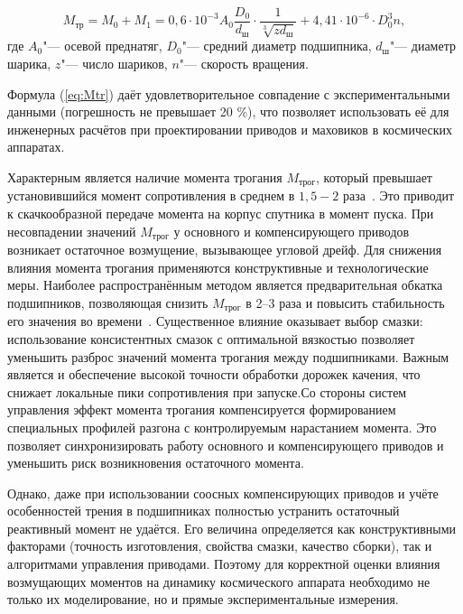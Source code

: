 \begin{equation}
	\label{eq:Mtr}
	M_{\text{тр}} = M_0 + M_1 = 0{,}6 \cdot 10^{-3} A_0
	\frac{D_0}{d_{\text{ш}}} \cdot \frac{1}{\sqrt[3]{z d_{\text{ш}}}}+4{,}41 \cdot 10^{-6} \cdot D_0^3 n,
\end{equation}
где \(A_0\)"--- осевой преднатяг, \(D_0\)"--- средний диаметр подшипника, \(d_{\text{ш}}\)"--- диаметр шарика, \(z\)"--- число шариков, \(n\)"--- скорость вращения.
	
Формула (\ref{eq:Mtr}) даёт удовлетворительное совпадение с экспериментальными данными (погрешность не превышает 20 \%), что позволяет использовать её для инженерных расчётов при проектировании приводов и маховиков в космических аппаратах.

Характерным является наличие момента трогания $M_{\text{трог}}$, который превышает установившийся момент сопротивления в среднем в $1,5-2$ раза~\cite{Mikhailov2014}. Это приводит к скачкообразной передаче момента на корпус спутника в момент пуска. При несовпадении значений $M_{\text{трог}}$ у основного и компенсирующего приводов возникает остаточное возмущение, вызывающее угловой дрейф. Для снижения влияния момента трогания применяются конструктивные и технологические меры. Наиболее распространённым методом является предварительная обкатка подшипников, позволяющая снизить $M_{\text{трог}}$ в 2–3 раза и повысить стабильность его значения во времени~\cite{Mikhailov2014}. Существенное влияние оказывает выбор смазки: использование консистентных смазок с оптимальной вязкостью позволяет уменьшить разброс значений момента трогания между подшипниками. Важным является и обеспечение высокой точности обработки дорожек качения, что снижает локальные пики сопротивления при запуске.Со стороны систем управления эффект момента трогания компенсируется формированием специальных профилей разгона с контролируемым нарастанием момента. Это позволяет синхронизировать работу основного и компенсирующего приводов и уменьшить риск возникновения остаточного момента.

Однако, даже при использовании соосных компенсирующих приводов и учёте особенностей трения в подшипниках полностью устранить остаточный реактивный момент не удаётся. Его величина определяется как конструктивными факторами (точность изготовления, свойства смазки, качество сборки), так и алгоритмами управления приводами. Поэтому для корректной оценки влияния возмущающих моментов на динамику космического аппарата необходимо не только их моделирование, но и прямые экспериментальные измерения.

